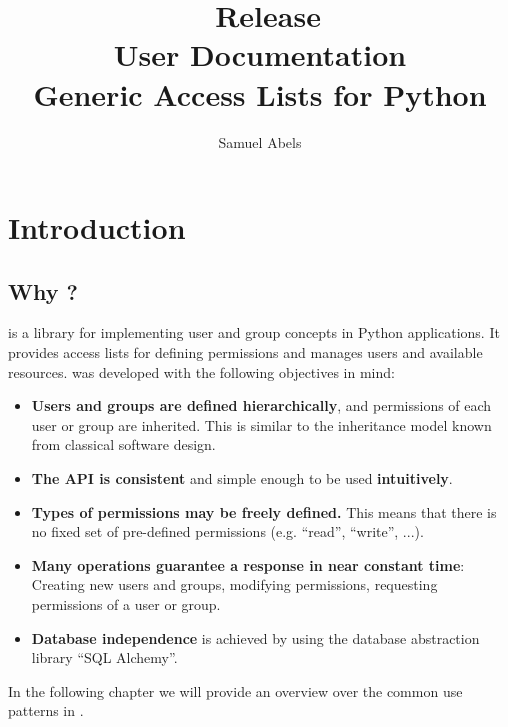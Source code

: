 \title{\productname\ Release \productversion\\
User Documentation\\
\vspace{5 mm}
\large Generic Access Lists for Python}
\author{Samuel Abels}


\maketitle
\tableofcontents

\newpage
\section{Introduction}
\subsection{Why \productname?}

\product is a library for implementing user and group concepts in Python
applications. It provides access lists for defining permissions and manages 
users and available resources.
\product was developed with the following objectives in mind:

\begin{itemize}
\item {\bf Users and groups are defined hierarchically}, and permissions of 
each user or group are inherited. This is similar to the inheritance 
model known from classical software design.

\item {\bf The API is consistent} and simple enough to be used 
{\bf intuitively}.

\item {\bf Types of permissions may be freely defined.} This means that 
there is no fixed set of pre-defined permissions (e.g. ``read'', ``write'', 
...).

\item {\bf Many operations guarantee a response in near constant time}: 
Creating new users and groups, modifying permissions, requesting 
permissions of a user or group.

\item {\bf Database independence} is achieved by using the database 
abstraction library ``SQL Alchemy''. 
\end{itemize}

In the following chapter we will provide an overview over the common 
use patterns in \product.


